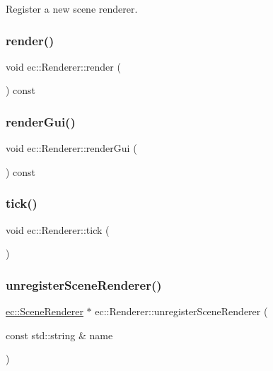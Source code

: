 Register a new scene renderer. \mbox{\label{classec_1_1_renderer_a7ff2c9444ad5da2a6db3331f19cb12f9}} 
\subsubsection{\texorpdfstring{render()}{render()}}
{\footnotesize\ttfamily void ec\+::\+Renderer\+::render (\begin{DoxyParamCaption}{ }\end{DoxyParamCaption}) const}

\mbox{\label{classec_1_1_renderer_a7dcfbdfd04d48452aba34a591b48341f}} 
\subsubsection{\texorpdfstring{render\+Gui()}{renderGui()}}
{\footnotesize\ttfamily void ec\+::\+Renderer\+::render\+Gui (\begin{DoxyParamCaption}{ }\end{DoxyParamCaption}) const\hspace{0.3cm}{\ttfamily [protected]}}

\mbox{\label{classec_1_1_renderer_a6dcc619251e6e4ec7f088567cba6fd57}} 
\subsubsection{\texorpdfstring{tick()}{tick()}}
{\footnotesize\ttfamily void ec\+::\+Renderer\+::tick (\begin{DoxyParamCaption}{ }\end{DoxyParamCaption})}

\mbox{\label{classec_1_1_renderer_a5c853ee4c34b069cc8142db8409abac6}} 
\subsubsection{\texorpdfstring{unregister\+Scene\+Renderer()}{unregisterSceneRenderer()}}
{\footnotesize\ttfamily \mbox{\hyperlink{classec_1_1_scene_renderer}{ec\+::\+Scene\+Renderer}} $\ast$ ec\+::\+Renderer\+::unregister\+Scene\+Renderer (\begin{DoxyParamCaption}\item[{const std\+::string \&}]{name }\end{DoxyParamCaption})}

